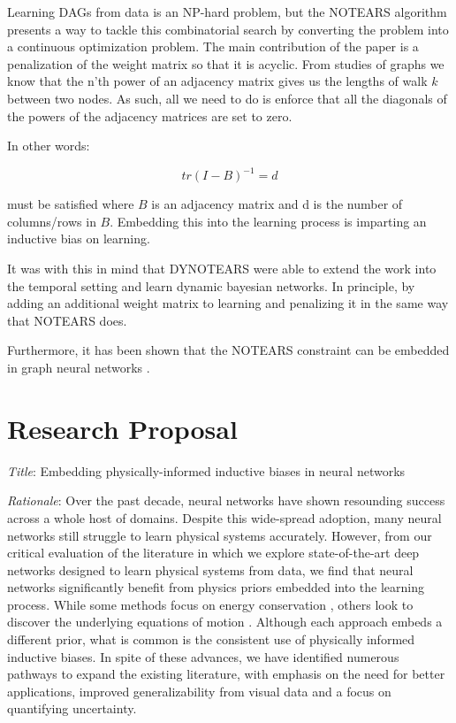 \documentclass{article}
\begin{document}
Learning DAGs from data is an NP-hard problem, but the NOTEARS algorithm \cite{zheng_dags_2018} presents a way to tackle this combinatorial search by converting the problem into a continuous optimization problem. The main contribution of the paper is a penalization of the weight matrix so that it is acyclic. From studies of graphs we know that the n'th power of an adjacency matrix gives us the lengths of walk $k$ between two nodes. As such, all we need to do is enforce that all the diagonals of the powers of the adjacency matrices are set to zero. 

In other words:

$$ tr(I-B)^{-1} = d $$

must be satisfied where $B$ is an adjacency matrix and d is the number of columns/rows in $B$. Embedding this into the learning process is imparting an inductive bias on learning. 

It was with this in mind that DYNOTEARS \cite{pamfil_dynotears_2020} were able to extend the work into the temporal setting and learn dynamic bayesian networks. In principle, by adding an additional weight matrix to learning and penalizing it in the same way that NOTEARS does.

Furthermore, it has been shown that the NOTEARS constraint can be embedded in graph neural networks \cite{lachapelle_gradient-based_2020,yu_dag-gnn_nodate}.

\pagebreak
\section{Research Proposal}

\textit{Title}: Embedding physically-informed inductive biases in neural networks

\textit{Rationale}: Over the past decade, neural networks have shown resounding success across a whole host of domains. Despite this wide-spread adoption, many neural networks still struggle to learn physical systems accurately. However, from our critical evaluation of the literature in which we explore state-of-the-art deep networks designed to learn physical systems from data, we find that neural networks significantly benefit from physics priors embedded into the learning process. While some methods focus on energy conservation \cite{greydanus_hamiltonian_2019,toth_hamiltonian_2019}, others look to discover the underlying equations of motion \cite{udrescu_symbolic_2020,iten_discovering_2020,brunton_discovering_2016}. Although each approach embeds a different prior, what is common is the consistent use of physically informed inductive biases. In spite of these advances, we have identified numerous pathways to expand the existing literature, with emphasis on the need for better applications, improved generalizability from visual data and a focus on quantifying uncertainty. 
\end{document}
